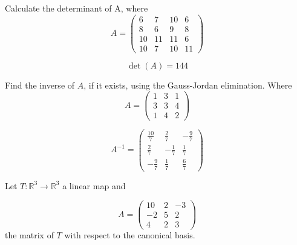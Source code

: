 \begin{questions}

\question Calculate the determinant of A, where
$$
A=\left(\begin{array}{rrrr}
6 & 7 & 10 & 6 \\
8 & 6 & 9 & 8 \\
10 & 11 & 11 & 6 \\
10 & 7 & 10 & 11
\end{array}\right)
$$

\begin{solution}
$$\det(A)=144$$
\end{solution}

\question Find the inverse of $A$, if it exists, using the Gauss-Jordan elimination. Where
$$
A=\left(\begin{array}{rrr}
1 & 3 & 1 \\
3 & 3 & 4 \\
1 & 4 & 2
\end{array}\right)
$$

\begin{solution}
$$A^{-1}=\left(\begin{array}{rrr}
\frac{10}{7} & \frac{2}{7} & -\frac{9}{7} \\
\frac{2}{7} & -\frac{1}{7} & \frac{1}{7} \\
-\frac{9}{7} & \frac{1}{7} & \frac{6}{7}
\end{array}\right)$$
\end{solution}

\question Let $T:\mathbb{R}^3\rightarrow\mathbb{R}^3$  a linear map and
 
$$
A=\left(\begin{array}{rrr}
10 & 2 & -3 \\
-2 & 5 & 2 \\
4 & 2 & 3
\end{array}\right)
$$
the matrix of $T$ with respect to the canonical basis.
\end{questions}
